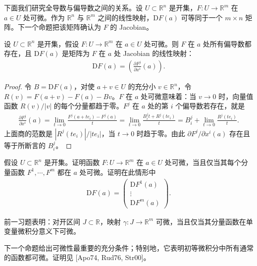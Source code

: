 \documentclass[../../main.tex]{subfiles}
\begin{document}
下面我们研究全导数与偏导数之间的关系。设 $U\subset\mathbb R^n$ 是开集，$F:U\to\mathbb R^m$ 在 $a\in U$ 处可微。作为 $\mathbb R^n$ 与 $\mathbb R^m$ 之间的线性映射，$\mathrm{D}F(a)$ 可等同于一个 $m\times n$ 矩阵。下一个命题把该矩阵确认为 $F$ 的 Jacobian。

\begin{proposition}\label{proposition:appC-jacobian}
设 $U\subset\mathbb R^n$ 是开集，假设 $F:U\to\mathbb R^m$ 在 $a\in U$ 处可微。则 $F$ 在 $a$ 处所有偏导数都存在，且 $\mathrm{D}F(a)$ 是矩阵为 $F$ 在 $a$ 处 Jacobian 的线性映射：
\begin{align*}
\mathrm{D}F(a)=\left(\frac{\partial F^j}{\partial x^i}(a)\right).
\end{align*}
\end{proposition}

\begin{proof}
令 $B=\mathrm{D}F(a)$，对使 $a+v\in U$ 的充分小 $v\in\mathbb R^n$，令 $R(v)=F(a+v)-F(a)-Bv$。$F$ 在 $a$ 处可微意味着：当 $v\to0$ 时，向量值函数 $R(v)/|v|$ 的每个分量都趋于零。$F^j$ 在 $a$ 处的第 $i$ 个偏导数若存在，就是
\begin{align*}
\frac{\partial F^j}{\partial x^i}(a)=\lim_{t\to0}\frac{F^j(a+te_i)-F^j(a)}{t}
=\lim_{t\to0}\frac{B^j_i t+R^j(te_i)}{t}
=B^j_i+\lim_{t\to0}\frac{R^j(te_i)}{t}.
\end{align*}
上面商的范数是 $|R^j(te_i)|/|te_i|$，当 $t\to0$ 时趋于零。由此 $\partial F^j/\partial x^i(a)$ 存在且等于所断言的 $B^j_i$。
\end{proof}

\begin{exercise}\label{exercise:appC-C-9}
假设 $U\subset\mathbb R^n$ 是开集。证明函数 $F:U\to\mathbb R^m$ 在 $a\in U$ 处可微，当且仅当其每个分量函数 $F^1,\cdots ,F^m$ 都在 $a$ 处可微。证明在此情形中
\begin{align*}
\mathrm{D}F(a)=\begin{pmatrix}\mathrm{D}F^1(a)\\ \vdots\\ \mathrm{D}F^m(a)\end{pmatrix}.
\end{align*}
\end{exercise}

前一习题表明：对开区间 $J\subset\mathbb R$，映射 $\gamma:J\to\mathbb R^m$ 可微，当且仅当其分量函数在单变量微积分意义下可微。

下一个命题给出可微性最重要的充分条件；特别地，它表明初等微积分中所有通常的函数都可微。证明见 [Apo74, Rud76, Str00]。
\end{document}
